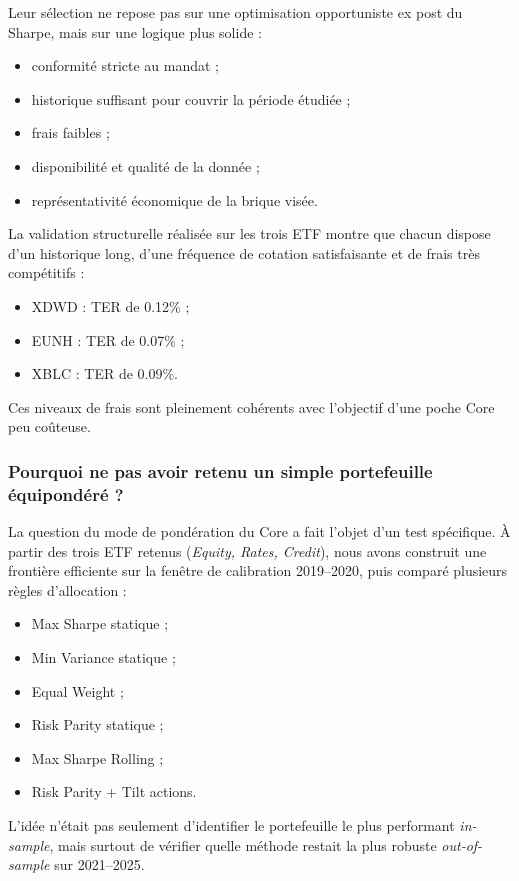\documentclass{article}
\begin{document}
Leur sélection ne repose pas sur une optimisation opportuniste ex post du Sharpe, mais sur une logique plus solide :
\begin{itemize}
    \item conformité stricte au mandat ;
    \item historique suffisant pour couvrir la période étudiée ;
    \item frais faibles ;
    \item disponibilité et qualité de la donnée ;
    \item représentativité économique de la brique visée.
\end{itemize}

La validation structurelle réalisée sur les trois ETF montre que chacun dispose d’un historique long, d’une fréquence de cotation satisfaisante et de frais très compétitifs :
\begin{itemize}
    \item XDWD : TER de 0.12\% ;
    \item EUNH : TER de 0.07\% ;
    \item XBLC : TER de 0.09\%.
\end{itemize}

Ces niveaux de frais sont pleinement cohérents avec l’objectif d’une poche Core peu coûteuse.

\subsubsection{Pourquoi ne pas avoir retenu un simple portefeuille équipondéré ?}

La question du mode de pondération du Core a fait l’objet d’un test spécifique.  
À partir des trois ETF retenus (\textit{Equity, Rates, Credit}), nous avons construit une frontière efficiente sur la fenêtre de calibration 2019--2020, puis comparé plusieurs règles d’allocation :

\begin{itemize}
    \item Max Sharpe statique ;
    \item Min Variance statique ;
    \item Equal Weight ;
    \item Risk Parity statique ;
    \item Max Sharpe Rolling ;
    \item Risk Parity + Tilt actions.
\end{itemize}

L’idée n’était pas seulement d’identifier le portefeuille le plus performant \textit{in-sample}, mais surtout de vérifier quelle méthode restait la plus robuste \textit{out-of-sample} sur 2021--2025.
\end{document}
